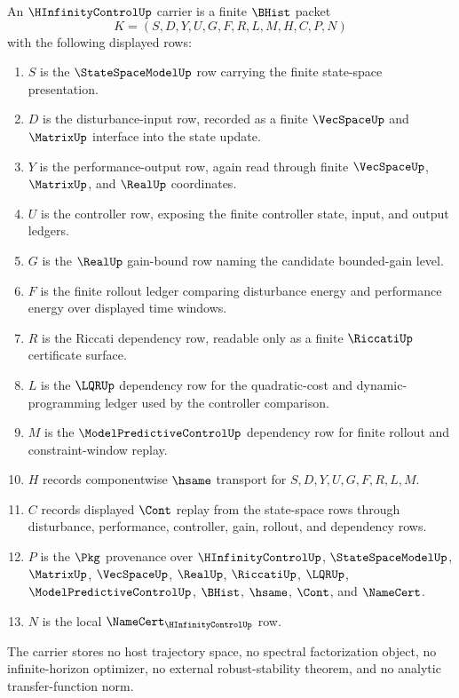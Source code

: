 \begin{definition}
\label{def:h-infinity-control-carrier}
An $\HInfinityControlUp$ carrier is a finite $\BHist$ packet
$$
K=(S,D,Y,U,G,F,R,L,M,H,C,P,N)
$$
with the following displayed rows:
\begin{enumerate}
\item $S$ is the $\StateSpaceModelUp$ row carrying the finite state-space presentation.
\item $D$ is the disturbance-input row, recorded as a finite $\VecSpaceUp$ and $\MatrixUp$ interface into the state update.
\item $Y$ is the performance-output row, again read through finite $\VecSpaceUp$, $\MatrixUp$, and $\RealUp$ coordinates.
\item $U$ is the controller row, exposing the finite controller state, input, and output ledgers.
\item $G$ is the $\RealUp$ gain-bound row naming the candidate bounded-gain level.
\item $F$ is the finite rollout ledger comparing disturbance energy and performance energy over displayed time windows.
\item $R$ is the Riccati dependency row, readable only as a finite $\RiccatiUp$ certificate surface.
\item $L$ is the $\LQRUp$ dependency row for the quadratic-cost and dynamic-programming ledger used by the controller comparison.
\item $M$ is the $\ModelPredictiveControlUp$ dependency row for finite rollout and constraint-window replay.
\item $H$ records componentwise $\hsame$ transport for $S,D,Y,U,G,F,R,L,M$.
\item $C$ records displayed $\Cont$ replay from the state-space rows through disturbance, performance, controller, gain, rollout, and dependency rows.
\item $P$ is the $\Pkg$ provenance over $\HInfinityControlUp$, $\StateSpaceModelUp$, $\MatrixUp$, $\VecSpaceUp$, $\RealUp$, $\RiccatiUp$, $\LQRUp$, $\ModelPredictiveControlUp$, $\BHist$, $\hsame$, $\Cont$, and $\NameCert$.
\item $N$ is the local $\NameCert_{\HInfinityControlUp}$ row.
\end{enumerate}
The carrier stores no host trajectory space, no spectral factorization object, no infinite-horizon optimizer, no external robust-stability theorem, and no analytic transfer-function norm.
\end{definition}

